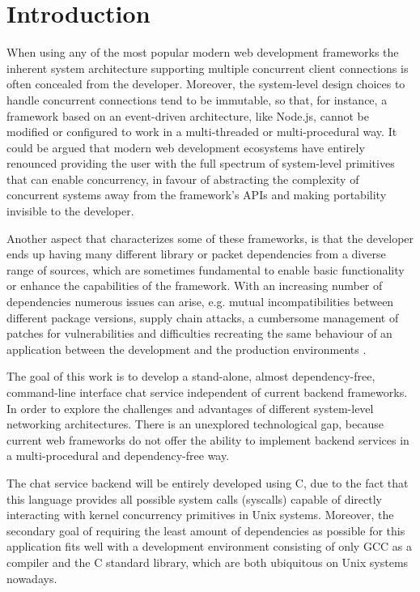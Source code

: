 \section{Introduction}
When using any of the most popular modern web development frameworks the inherent system architecture supporting multiple concurrent client connections is often concealed from the developer. Moreover, the system-level design choices to handle concurrent connections tend to be immutable, so that, for instance, a framework based on an event-driven architecture, like Node.js, cannot be modified or configured to work in a multi-threaded or multi-procedural way. It could be argued that modern web development ecosystems have entirely renounced providing the user with the full spectrum of system-level primitives that can enable concurrency, in favour of abstracting the complexity of concurrent systems away from the framework's APIs and making portability invisible to the developer.

\cite{2005Threads} \cite{2013ContextSwitching}\cite{2003Events}

Another aspect that characterizes some of these frameworks, is that the developer ends up having many different library or packet dependencies from a diverse range of sources, which are sometimes fundamental to enable basic functionality or enhance the capabilities of the framework. With an increasing number of dependencies numerous issues can arise, e.g. mutual incompatibilities between different package versions, supply chain attacks, a cumbersome management of patches for vulnerabilities and difficulties recreating the same behaviour of an application between the development and the production environments \cite{2012PoulHenning}. 

The goal of this work is to develop a stand-alone, almost dependency-free, command-line interface chat service independent of current backend frameworks. In order to explore the challenges and advantages of different system-level networking architectures. There is an unexplored technological gap, because current web frameworks do not offer the ability to implement backend services in a multi-procedural and dependency-free way. 

The chat service backend will be entirely developed using C, due to the fact that this language provides all possible system calls (syscalls) capable of directly interacting with kernel concurrency primitives in Unix systems. Moreover, the secondary goal of requiring the least amount of dependencies as possible for this application fits well with a development environment consisting of only GCC as a compiler and the C standard library, which are both ubiquitous on Unix systems nowadays. 

